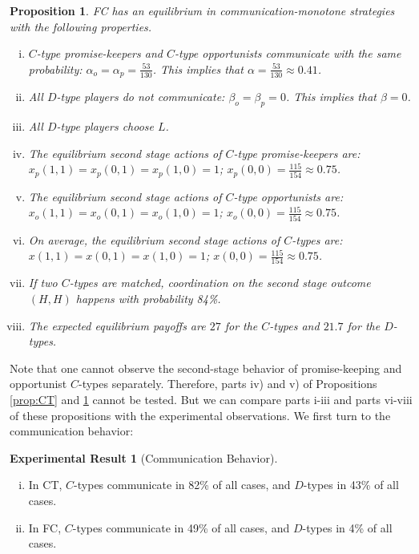 \documentclass[12pt]{article}
\newtheorem{proposition}{Proposition} \theoremstyle{definition}
\theoremstyle{break}
\newtheorem{result}{Experimental Result}\theoremstyle{break}
\begin{document}
\begin{proposition}\label{prop:FC}
	FC has an equilibrium in communication-monotone strategies with the following properties.
	\begin{enumerate}[i)]\setlength\itemsep{0em}
		\item $C$-type promise-keepers and $C$-type opportunists communicate with the same probability: $\alpha_o=\alpha_p=\frac{53}{130}$. This implies that $\alpha=\frac{53}{130}\approx 0.41$.
		\item All $D$-type players do not communicate: $\beta_o=\beta_p=0$. This implies that $\beta=0$.
		\item All $D$-type players choose $L$.
		\item The equilibrium second stage actions of $C$-type promise-keepers are:  $x_p(1,1)=x_p(0,1)=x_p(1,0)=1$; $x_p(0,0)=\frac{115}{154}\approx 0.75$.
		\item The equilibrium second stage actions of $C$-type opportunists are:  \\$x_o(1,1)=x_o(0,1)=x_o(1,0)=1$;  $x_o(0,0)=\frac{115}{154}\approx 0.75$.
		\item  On average, the equilibrium second stage actions of $C$-types are:  $x(1,1)=x(0,1)=x(1,0)=1$;  $x(0,0)=\frac{115}{154}\approx 0.75$.
		\item If two $C$-types are matched, coordination on the second stage outcome $(H,H)$ happens with probability 84\%.
		\item The expected equilibrium payoffs are $27$ for the $C$-types and $21.7$ for the $D$-types.
	\end{enumerate}
\end{proposition}
%
Note that one cannot observe the second-stage behavior of promise-keeping and opportunist $C$-types separately. Therefore, parts iv) and v) of Propositions \ref{prop:CT} and \ref{prop:FC} cannot be tested. But we can compare parts i-iii and parts vi-viii of these propositions with the experimental observations. We first turn to the communication behavior:


\begin{result}[Communication Behavior]
	\begin{enumerate}[i)]\setlength\itemsep{0em}
		\item In CT, $C$-types communicate in 82\% of all cases, and $D$-types in 43\% of all cases.
		\item In FC, $C$-types communicate in 49\% of all cases, and $D$-types in 4\% of all cases.
	\end{enumerate}
\end{result}
\end{document}
